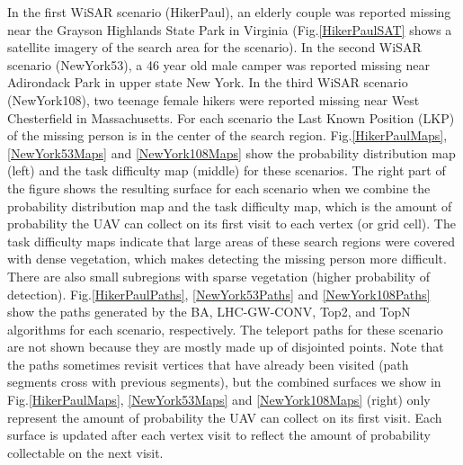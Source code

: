 \documentclass[journal]{IEEEtran}
\begin{document}
In the first WiSAR scenario (HikerPaul), an elderly couple was reported missing near the Grayson Highlands State Park in Virginia (Fig.\ref{HikerPaulSAT} shows a satellite imagery of the search area for the scenario). In the second WiSAR scenario (NewYork53), a 46 year old male camper was reported missing near Adirondack Park in upper state New York. In the third WiSAR scenario (NewYork108), two teenage female hikers were reported missing near West Chesterfield in Massachusetts. For each scenario the Last Known Position (LKP) of the missing person is in the center of the search region. Fig.\ref{HikerPaulMaps}, \ref{NewYork53Maps} and \ref{NewYork108Maps} show the probability distribution map (left) and the task difficulty map (middle) for these scenarios. The right part of the figure shows the resulting surface for each scenario when we combine the probability distribution map and the task difficulty map, which is the amount of probability the UAV can collect on its first visit to each vertex (or grid cell). The task difficulty maps indicate that large areas of these search regions were covered with dense vegetation, which makes detecting the missing person more difficult. There are also small subregions with sparse vegetation (higher probability of detection). Fig.\ref{HikerPaulPaths}, \ref{NewYork53Paths} and \ref{NewYork108Paths} show the paths generated by the BA, LHC-GW-CONV, Top2, and TopN algorithms for each scenario, respectively. The teleport paths for these scenario are not shown because they are mostly made up of disjointed points. Note that the paths sometimes revisit vertices that have already been visited (path segments cross with previous segments), but the combined surfaces we show in Fig.\ref{HikerPaulMaps}, \ref{NewYork53Maps} and \ref{NewYork108Maps} (right) only represent the amount of probability the UAV can collect on its first visit. Each surface is updated after each vertex visit to reflect the amount of probability collectable on the next visit.

\end{document}
